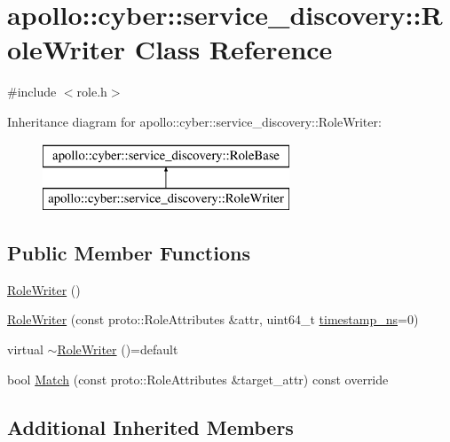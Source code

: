 \hypertarget{classapollo_1_1cyber_1_1service__discovery_1_1RoleWriter}{\section{apollo\-:\-:cyber\-:\-:service\-\_\-discovery\-:\-:Role\-Writer Class Reference}
\label{classapollo_1_1cyber_1_1service__discovery_1_1RoleWriter}
}


{\ttfamily \#include $<$role.\-h$>$}

Inheritance diagram for apollo\-:\-:cyber\-:\-:service\-\_\-discovery\-:\-:Role\-Writer\-:\begin{figure}[H]
\begin{center}
\leavevmode
\includegraphics[height=2.000000cm]{classapollo_1_1cyber_1_1service__discovery_1_1RoleWriter}
\end{center}
\end{figure}
\subsection*{Public Member Functions}
\begin{DoxyCompactItemize}
\item 
\hyperlink{classapollo_1_1cyber_1_1service__discovery_1_1RoleWriter_a2c71b9037411483a90817a3bb56f4b5f}{Role\-Writer} ()
\item 
\hyperlink{classapollo_1_1cyber_1_1service__discovery_1_1RoleWriter_aa99abf5fedb9185feec347063351a402}{Role\-Writer} (const proto\-::\-Role\-Attributes \&attr, uint64\-\_\-t \hyperlink{classapollo_1_1cyber_1_1service__discovery_1_1RoleBase_afada3e0a6c73eefed35c47088e3540c1}{timestamp\-\_\-ns}=0)
\item 
virtual \hyperlink{classapollo_1_1cyber_1_1service__discovery_1_1RoleWriter_a2c9e73ffcdc33385836a59de93b188f3}{$\sim$\-Role\-Writer} ()=default
\item 
bool \hyperlink{classapollo_1_1cyber_1_1service__discovery_1_1RoleWriter_a090191ac91052e37bee6ec361bb2fc50}{Match} (const proto\-::\-Role\-Attributes \&target\-\_\-attr) const override
\end{DoxyCompactItemize}
\subsection*{Additional Inherited Members}


